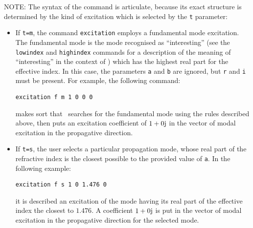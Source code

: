 NOTE: The syntax of the command is articulate, because its exact structure is determined by the kind of excitation which is selected by the \lstinline!t! parameter:
\begin{itemize}
\item[--] If \lstinline!t=m!, the command \lstinline!excitation! employs a fundamental mode excitation. The fundamental mode is the mode recognised as ``interesting'' (see the \lstinline!lowindex! and \lstinline!highindex! commands for a description of the meaning of ``interesting'' in the context of \afmm ) which has the highest real part for the effective index. In this case, the parameters \lstinline!a! and \lstinline!b! are ignored, but \lstinline!r! and \lstinline!i! must be present. For example, the following command:
\begin{lstlisting}
excitation f m 1 0 0 0
\end{lstlisting}
makes sort that \afmm\ searches for the fundamental mode using the rules described above, then puts an excitation coefficient of $1+0\mathrm{j}$ in the vector of modal excitation in the propagative direction.

\item[--] If \lstinline!t=s!, the user selects a particular propagation
 mode, whose real part of the refractive index is the closest possible to the provided value of \lstinline!a!. In the following example:
\begin{lstlisting}
excitation f s 1 0 1.476 0
\end{lstlisting}
it is described an excitation of the mode having its real part of the effective index the closest to $1.476$. A coefficient $1+0\mathrm{j}$ is put in the vector of modal excitation in the propagative direction for the selected mode.
 

\end{itemize}
